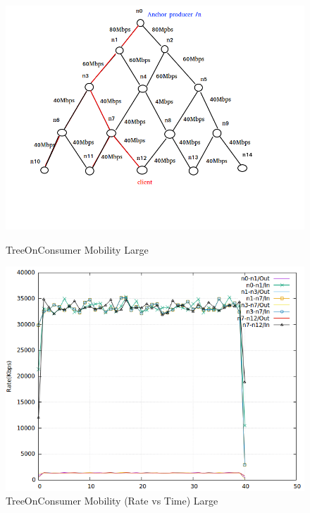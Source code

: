 \begin{figure}[H]

\begin{center}

\includegraphics[scale = 0.5]{Figures/Mob3.png}

\caption{TreeOnConsumer Mobility Large} \label{Mob3} 


\includegraphics[scale = 0.5]{Figures/mob3.png}

\caption{TreeOnConsumer Mobility (Rate vs Time) Large} \label{mob3} 


\end{center}

\end{figure}






